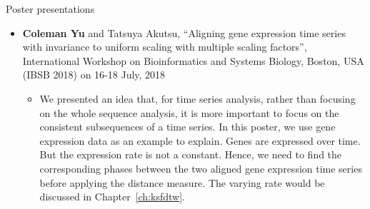 \noindent Poster presentations
\begin{itemize}
    \item \textbf{Coleman Yu} and Tatsuya Akutsu, ``Aligning gene expression time series with invariance to uniform scaling with multiple scaling factors'', 
    International Workshop on Bioinformatics and Systems Biology, Boston, USA (IBSB 2018) on 16-18 July, 2018
    \begin{itemize}
        \item We presented an idea that, for time series analysis, rather than focusing on the whole sequence analysis, it is more important to focus on the consistent subsequences of a time series. 
        In this poster, we use gene expression data as an example to explain. Genes are expressed over time. But the expression rate is not a constant. 
        Hence, we need to find the corresponding phases between the two aligned gene expression time series before applying the distance measure.
        The varying rate would be discussed in Chapter~\ref{ch:ksfdtw}. 
    \end{itemize}
\end{itemize}